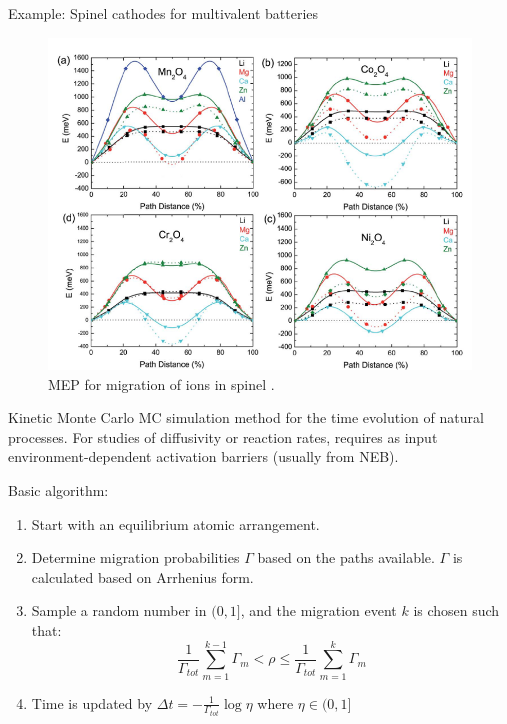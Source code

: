 \documentclass[aspectratio=169]{beamer}
\begin{document}
\begin{frame}{Example: Spinel cathodes for multivalent batteries}
\begin{figure}
    \centering
    \includegraphics[width=0.5\linewidth]{lectures/figures/12-Multivalent_Cathodes.png}
    \caption{MEP for migration of ions in spinel .\cite{liuSpinelCompoundsMultivalent2014}}
\end{figure} 
\end{frame} 

\begin{frame}{Kinetic Monte Carlo}
MC simulation method for the time evolution of natural processes. For studies of diffusivity or reaction rates, requires as input environment-dependent activation barriers (usually from NEB).

Basic algorithm:
\begin{enumerate}
    \item Start with an equilibrium atomic arrangement.
    \item Determine  migration probabilities $\Gamma$ based on the paths available. $\Gamma$ is calculated based on Arrhenius form.
    \item Sample a random number in $(0,1]$, and the migration event $k$ is chosen such that:
    \begin{equation*}
    \frac{1}{\Gamma_{tot}} \sum_{m=1}^{k-1} \Gamma_m < \rho \leq \frac{1}{\Gamma_{tot}} \sum_{m=1}^{k} \Gamma_m 
    \end{equation*} 
    \item Time is updated by $\Delta t = - \frac{1}{\Gamma_{tot}} \log \eta$ where $\eta \in (0,1]$

\end{enumerate}

\end{frame} 
\end{document}
